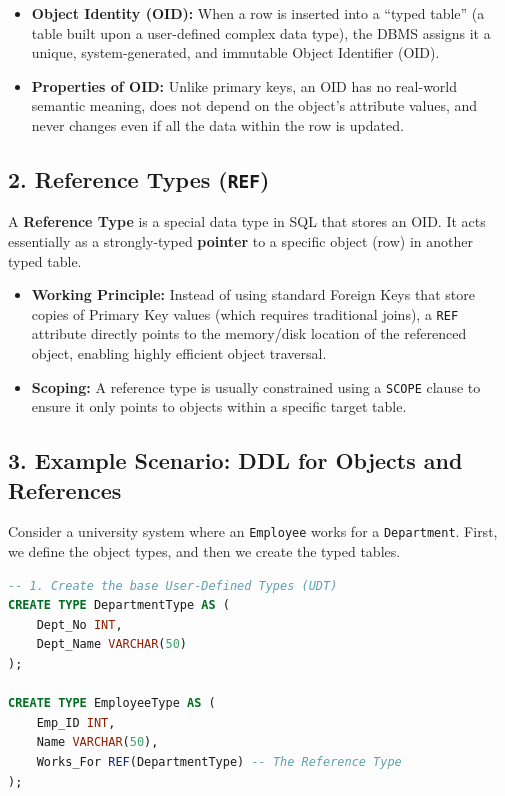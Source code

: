 \documentclass[12pt,a3paper]{article}
\begin{document}
\begin{enumerate}
\begin{tcolorbox}[enhanced,breakable,ansbox,colback=cA!4,colframe=cA,boxrule=0.8pt,arc=5pt,title={\textbf{Answer}},fonttitle=\bfseries\color{white},colbacktitle=cA]
\begin{itemize}
    \item \textbf{Object Identity (OID):} When a row is inserted into a ``typed table'' (a table built upon a user-defined complex data type), the DBMS assigns it a unique, system-generated, and immutable Object Identifier (OID).
    \item \textbf{Properties of OID:} Unlike primary keys, an OID has no real-world semantic meaning, does not depend on the object's attribute values, and never changes even if all the data within the row is updated.
\end{itemize}

\subsection*{2. Reference Types (\texttt{REF})}

A \textbf{Reference Type} is a special data type in SQL that stores an OID. It acts essentially as a strongly-typed \textbf{pointer} to a specific object (row) in another typed table.
\begin{itemize}
    \item \textbf{Working Principle:} Instead of using standard Foreign Keys that store copies of Primary Key values (which requires traditional joins), a \texttt{REF} attribute directly points to the memory/disk location of the referenced object, enabling highly efficient object traversal.
    \item \textbf{Scoping:} A reference type is usually constrained using a \texttt{SCOPE} clause to ensure it only points to objects within a specific target table.
\end{itemize}

\subsection*{3. Example Scenario: DDL for Objects and References}

Consider a university system where an \texttt{Employee} works for a \texttt{Department}. First, we define the object types, and then we create the typed tables.

\begin{lstlisting}[language=SQL]
-- 1. Create the base User-Defined Types (UDT)
CREATE TYPE DepartmentType AS (
    Dept_No INT,
    Dept_Name VARCHAR(50)
);

CREATE TYPE EmployeeType AS (
    Emp_ID INT,
    Name VARCHAR(50),
    Works_For REF(DepartmentType) -- The Reference Type
);


\end{lstlisting}
\end{tcolorbox}
\end{enumerate}
\end{document}
